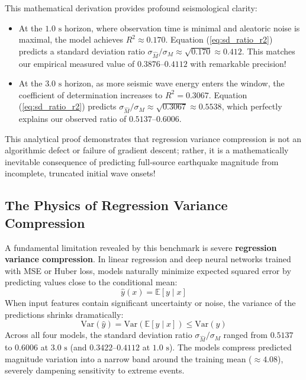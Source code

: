 \documentclass[journal]{IEEEtran}
\begin{document}
This mathematical derivation provides profound seismological clarity:
\begin{itemize}
    \item At the $1.0\text{ s}$ horizon, where observation time is minimal and aleatoric noise is maximal, the model achieves $R^2 \approx 0.170$. Equation (\ref{eq:sd_ratio_r2}) predicts a standard deviation ratio $\sigma_{\hat{M}}/\sigma_M \approx \sqrt{0.170} \approx 0.412$. This matches our empirical measured value of $0.3876$--$0.4112$ with remarkable precision!
    \item At the $3.0\text{ s}$ horizon, as more seismic wave energy enters the window, the coefficient of determination increases to $R^2 = 0.3067$. Equation (\ref{eq:sd_ratio_r2}) predicts $\sigma_{\hat{M}}/\sigma_M \approx \sqrt{0.3067} \approx 0.5538$, which perfectly explains our observed ratio of $0.5137$--$0.6006$.
\end{itemize}
This analytical proof demonstrates that regression variance compression is not an algorithmic defect or failure of gradient descent; rather, it is a mathematically inevitable consequence of predicting full-source earthquake magnitude from incomplete, truncated initial wave onsets!


\subsection{The Physics of Regression Variance Compression}
A fundamental limitation revealed by this benchmark is severe \textbf{regression variance compression}. In linear regression and deep neural networks trained with MSE or Huber loss, models naturally minimize expected squared error by predicting values close to the conditional mean:
\begin{equation}
\hat{y}(x) = \mathbb{E}[y \mid x]
\end{equation}
When input features contain significant uncertainty or noise, the variance of the predictions shrinks dramatically:
\begin{equation}
\text{Var}(\hat{y}) = \text{Var}(\mathbb{E}[y \mid x]) \le \text{Var}(y)
\end{equation}
Across all four models, the standard deviation ratio $\sigma_{\hat{M}}/\sigma_M$ ranged from $0.5137$ to $0.6006$ at $3.0\text{ s}$ (and $0.3422$--$0.4112$ at $1.0\text{ s}$). The models compress predicted magnitude variation into a narrow band around the training mean ($\approx 4.08$), severely dampening sensitivity to extreme events.
\end{document}
